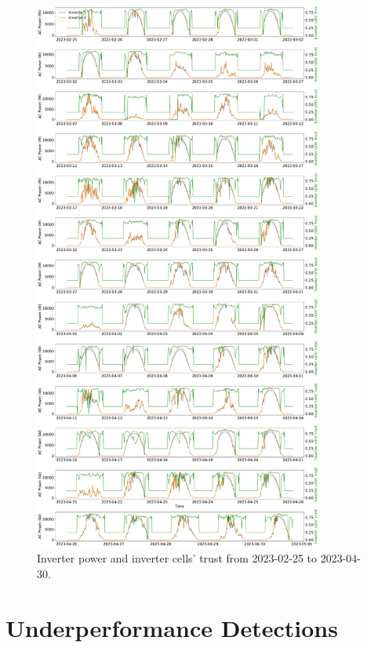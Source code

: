 \begin{figure}[hbtp]
    \centering
    \includegraphics[width=0.85\textwidth]{figures/appendix/c_results/all_power_and_trust_pt2.pdf}
    \caption{Inverter power and inverter cells' trust from 2023-02-25 to 2023-04-30.}
    \label{fig:alltimeseries_pt2}
\end{figure}

\FloatBarrier
\section{Underperformance Detections} \label{ap3:undereperfdet}

